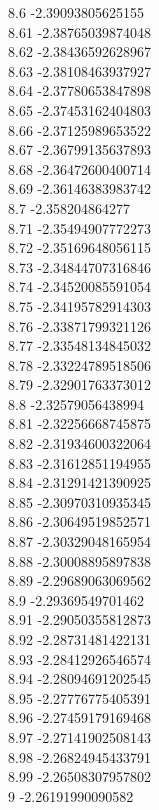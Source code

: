 {8.6	-2.39093805625155\\
8.61	-2.38765039874048\\
8.62	-2.38436592628967\\
8.63	-2.38108463937927\\
8.64	-2.37780653847898\\
8.65	-2.37453162404803\\
8.66	-2.37125989653522\\
8.67	-2.36799135637893\\
8.68	-2.36472600400714\\
8.69	-2.36146383983742\\
8.7	-2.358204864277\\
8.71	-2.35494907772273\\
8.72	-2.35169648056115\\
8.73	-2.34844707316846\\
8.74	-2.34520085591054\\
8.75	-2.34195782914303\\
8.76	-2.33871799321126\\
8.77	-2.33548134845032\\
8.78	-2.33224789518506\\
8.79	-2.32901763373012\\
8.8	-2.32579056438994\\
8.81	-2.32256668745875\\
8.82	-2.31934600322064\\
8.83	-2.31612851194955\\
8.84	-2.31291421390925\\
8.85	-2.30970310935345\\
8.86	-2.30649519852571\\
8.87	-2.30329048165954\\
8.88	-2.30008895897838\\
8.89	-2.29689063069562\\
8.9	-2.29369549701462\\
8.91	-2.29050355812873\\
8.92	-2.28731481422131\\
8.93	-2.28412926546574\\
8.94	-2.28094691202545\\
8.95	-2.27776775405391\\
8.96	-2.27459179169468\\
8.97	-2.27141902508143\\
8.98	-2.26824945433791\\
8.99	-2.26508307957802\\
9	-2.26191990090582\\
}
